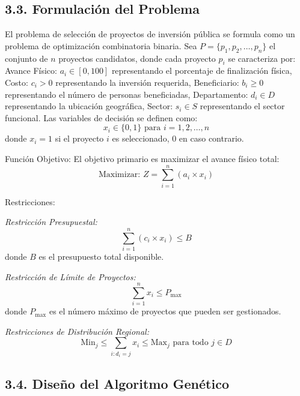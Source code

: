 \documentclass[12pt,a4paper]{article}
\begin{document}
\subsection*{3.3. Formulación del Problema}

El problema de selección de proyectos de inversión pública se formula como un problema de optimización combinatoria binaria. Sea $P = \{p_1, p_2, \ldots, p_n\}$ el conjunto de $n$ proyectos candidatos, donde cada proyecto $p_i$ se caracteriza por: Avance Físico: $a_i \in [0,100]$ representando el porcentaje de finalización física, Costo: $c_i > 0$ representando la inversión requerida, Beneficiario: $b_i \geq 0$ representando el número de personas beneficiadas, Departamento: $d_i \in D$ representando la ubicación geográfica, Sector: $s_i \in S$ representando el sector funcional. Las variables de decisión se definen como:
\begin{equation}
x_i \in \{0,1\} \text{ para } i = 1,2,\ldots,n
\end{equation}
    donde $x_i = 1$ si el proyecto $i$ es seleccionado, 0 en caso contrario.

Función Objetivo: 
El objetivo primario es maximizar el avance físico total:
\begin{equation}
\text{Maximizar: } Z = \sum_{i=1}^{n} (a_i \times x_i)
\end{equation}

Restricciones:

\textit{Restricción Presupuestal:}
\begin{equation}
\sum_{i=1}^{n} (c_i \times x_i) \leq B
\end{equation}
donde $B$ es el presupuesto total disponible.

\textit{Restricción de Límite de Proyectos:}
\begin{equation}
\sum_{i=1}^{n} x_i \leq P_{\max}
\end{equation}
donde $P_{\max}$ es el número máximo de proyectos que pueden ser gestionados.

\textit{Restricciones de Distribución Regional:}
\begin{equation}
\text{Min}_j \leq \sum_{i:d_i=j} x_i \leq \text{Max}_j \text{ para todo } j \in D
\end{equation}

\subsection*{3.4. Diseño del Algoritmo Genético}
\end{document}
